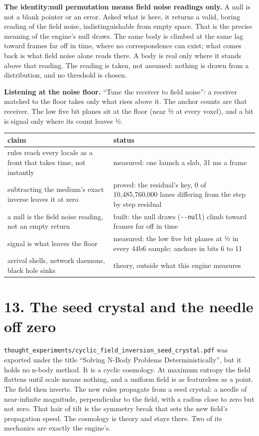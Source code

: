 \textbf{The identity:null permutation means field noise readings only.} A null is not a blank pointer or an error. Asked what is here, it returns a valid, boring reading of the field noise, indistinguishable from empty space. That is the precise meaning of the engine's null draws. The same body is climbed at the same lag toward frames far off in time, where no correspondence can exist; what comes back is what field noise alone reads there. A body is real only where it stands above that reading. The reading is taken, not assumed: nothing is drawn from a distribution, and no threshold is chosen.

\textbf{Listening at the noise floor.} “Tune the receiver to field noise”: a receiver matched to the floor takes only what rises above it. The anchor counts are that receiver. The low five bit planes sit at the floor (near ½ at every voxel), and a bit is signal only where its count leaves ½.

{\small
\setlength{\tabcolsep}{6pt}
\begin{longtable}{>{\RaggedRight\arraybackslash}p{}>{\RaggedRight\arraybackslash}p{}}
\toprule
claim & status \\
\midrule
\endhead
rules reach every locale as a front that takes time, not instantly & measured: one launch a slab, 31 ms a frame \\
subtracting the medium's exact inverse leaves it at zero & proved: the residual's key, 0 of 10,485,760,000 lanes differing from the step by step residual \\
a null is the field noise reading, not an empty return & built: the null draws (\texttt{-\allowbreak{}-\allowbreak{}null}) climb toward frames far off in time \\
signal is what leaves the floor & measured: the low five bit planes at ½ in every 44b6 sample; anchors in bits 6 to 11 \\
arrival shells, network daemons, black hole sinks & theory, outside what this engine measures \\
\bottomrule
\end{longtable}
}

\section{\texorpdfstring{13. The seed crystal and the needle off zero}{13. The seed crystal and the needle off zero}}

\texttt{thought\_\allowbreak{}experiments/\allowbreak{}cyclic\_\allowbreak{}field\_\allowbreak{}inversion\_\allowbreak{}seed\_\allowbreak{}crystal.\allowbreak{}pdf} was exported under the title “Solving N-Body Problems Deterministically”, but it holds no n-body method. It is a cyclic cosmology. At maximum entropy the field flattens until scale means nothing, and a uniform field is as featureless as a point. The field then inverts. The new rules propagate from a seed crystal: a needle of near-infinite magnitude, perpendicular to the field, with a radius close to zero but not zero. That hair of tilt is the symmetry break that sets the new field's propagation speed. The cosmology is theory and stays there. Two of its mechanics are exactly the engine's.

